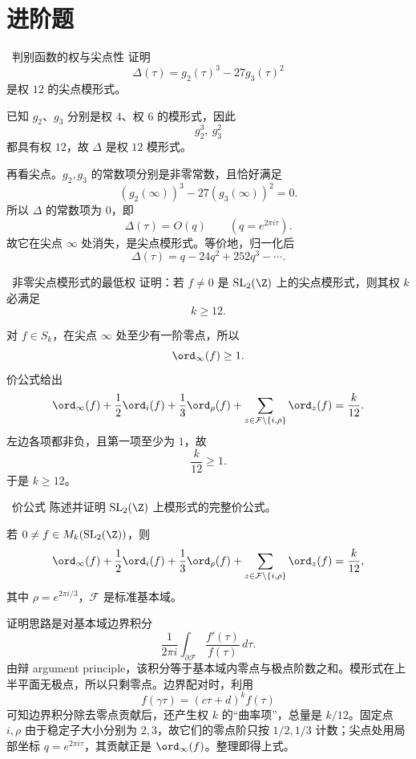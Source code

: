 \section{进阶题 \medium}

\begin{problem}{\medium\ 判别函数的权与尖点性}
证明
\[
\Delta(\tau)=g_2(\tau)^3-27g_3(\tau)^2
\]
是权 $12$ 的尖点模形式。
\end{problem}
\begin{solution}
已知 $g_2$、$g_3$ 分别是权 $4$、权 $6$ 的模形式，因此
\[
g_2^3,\ g_3^2
\]
都具有权 $12$，故 $\Delta$ 是权 $12$ 模形式。

再看尖点。$g_2,g_3$ 的常数项分别是非零常数，且恰好满足
\[
(g_2(\infty))^3-27(g_3(\infty))^2=0.
\]
所以 $\Delta$ 的常数项为 $0$，即
\[
\Delta(\tau)=O(q)\qquad (q=e^{2\pi i\tau}).
\]
故它在尖点 $\infty$ 处消失，是尖点模形式。等价地，归一化后
\[
\Delta(\tau)=q-24q^2+252q^3-\cdots.
\]
\end{solution}

\begin{problem}{\medium\ 非零尖点模形式的最低权}
证明：若 $f\neq0$ 是 $\mathrm{SL}_2(\Z)$ 上的尖点模形式，则其权 $k$ 必满足
\[
k\ge 12.
\]
\end{problem}
\begin{solution}
对 $f\in S_k$，在尖点 $\infty$ 处至少有一阶零点，所以
\[
\ord_\infty(f)\ge1.
\]
价公式给出
\[
\ord_\infty(f)+\frac12\ord_i(f)+\frac13\ord_\rho(f)
+\sum_{z\in \mathcal F\setminus\{i,\rho\}}\ord_z(f)=\frac{k}{12}.
\]
左边各项都非负，且第一项至少为 $1$，故
\[
\frac{k}{12}\ge1.
\]
于是 $k\ge12$。
\end{solution}

\begin{problem}{\medium\ 价公式}
陈述并证明 $\mathrm{SL}_2(\Z)$ 上模形式的完整价公式。
\end{problem}
\begin{solution}
若 $0\neq f\in M_k(\mathrm{SL}_2(\Z))$，则
\[
\ord_\infty(f)+\frac12\ord_i(f)+\frac13\ord_\rho(f)
+\sum_{z\in \mathcal F\setminus\{i,\rho\}}\ord_z(f)=\frac{k}{12},
\]
其中 $\rho=e^{2\pi i/3}$，$\mathcal F$ 是标准基本域。

证明思路是对基本域边界积分
\[
\frac{1}{2\pi i}\int_{\partial \mathcal F}\frac{f'(\tau)}{f(\tau)}\,d\tau.
\]
由辩 argument principle，该积分等于基本域内零点与极点阶数之和。模形式在上半平面无极点，所以只剩零点。边界配对时，利用
\[
f(\gamma\tau)=(c\tau+d)^k f(\tau)
\]
可知边界积分除去零点贡献后，还产生权 $k$ 的“曲率项”，总量是 $k/12$。固定点 $i,\rho$ 由于稳定子大小分别为 $2,3$，故它们的零点阶只按 $1/2,1/3$ 计数；尖点处用局部坐标 $q=e^{2\pi i\tau}$，其贡献正是 $\ord_\infty(f)$。整理即得上式。
\end{solution}

